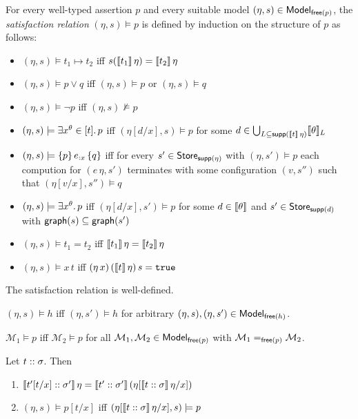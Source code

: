 \documentclass[12pt,a4paper]{report}
\begin{document}
\begin{definition}
  For every well-typed assertion $p$ and every suitable model $(\eta,s) \in \mathsf{Model}_{\mathsf{free}(p)}$,
  the {\em satisfaction relation} $(\eta,s) \models p$ is defined by induction on the structure of $p$ as follows:
  \begin{itemize}
    \item $(\eta,s) \models t_1 \mapsto t_2$ iff $s(\llbracket t_1\rrbracket\,\eta) = \llbracket t_2\rrbracket\,\eta$
    \item $(\eta,s) \models p \vee q$ iff $(\eta,s) \models p$ or $(\eta,s) \models q$
    \item $(\eta,s) \models \neg p$ iff $(\eta,s) \not\models p$
    \item $(\eta,s) \models \exists{x^\theta}\in{[t]}.\,{p}$ iff $(\eta[d/x],s) \models p$ for some
          $d \in \bigcup_{L\subseteq\mathsf{supp}(\llbracket t\rrbracket\,\eta)}\llbracket\theta\rrbracket_L$
    \item $(\eta,s) \models \{p\}\,e_{:x}\,\{q\}$ iff for every $s' \in \mathsf{Store}_{\mathsf{supp}(\eta)}$ with
          $(\eta,s') \models p$ each compution for $(e\,\eta,s')$ terminates with some
          configuration $(v,s'')$ such that $(\eta[v/x],s'')\models q$
    \item $(\eta,s) \models \exists{x^\theta}.\,{p}$ iff $(\eta[d/x],s') \models p$ for some $d \in \llbracket\theta\rrbracket$ and
          $s' \in \mathsf{Store}_{\mathsf{supp}(d)}$ with $\mathsf{graph}(s) \subseteq \mathsf{graph}(s')$
    \item $(\eta,s) \models t_1 = t_2$ iff $\llbracket t_1\rrbracket\,\eta = \llbracket t_2\rrbracket\,\eta$
    \item $(\eta,s) \models x\,t$ iff $(\eta\,x)\,(\llbracket t\rrbracket\,\eta)\,s = \mathtt{true}$
  \end{itemize}
\end{definition}

\begin{lemma}
  The satisfaction relation is well-defined.
\end{lemma}

\begin{lemma}
  $(\eta,s) \models h$ iff $(\eta,s') \models h$ for arbitrary $(\eta,s),(\eta,s')\in\mathsf{Model}_{\mathsf{free}(h)}$.
\end{lemma}

\begin{lemma}[Coincidence]
  $\mathcal{M}_1 \models p$ iff $\mathcal{M}_2 \models p$ for all $\mathcal{M}_1,\mathcal{M}_2\in\mathsf{Model}_{\mathsf{free}(p)}$
  with $\mathcal{M}_1 =_{\mathsf{free}(p)} \mathcal{M}_2$.
\end{lemma}

\begin{lemma}[Substitution]
  Let ${t}\mathrel{::}{\sigma}$. Then
  \begin{enumerate}
    \item $\llbracket{t'[t/x]}\mathrel{::}{\sigma'}\rrbracket\,\eta
           = \llbracket{t'}\mathrel{::}{\sigma'}\rrbracket\,(\eta[\llbracket{t}\mathrel{::}{\sigma}\rrbracket\,\eta/x])$
    \item $(\eta,s) \models p[t/x]$ iff $(\eta[\llbracket{t}\mathrel{::}{\sigma}\rrbracket\,\eta/x],s) \models p$
  \end{enumerate}
\end{lemma}
\end{document}

